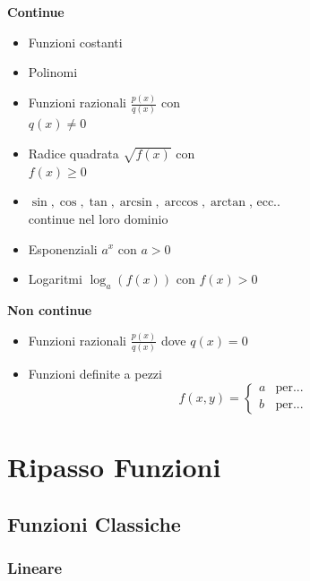 \documentclass{article}  %
\begin{document}
\begin{osservazioni}
	\begin{minipage}[t]{0.5\linewidth}
		\textbf{Continue}
		\begin{itemize}
			\item Funzioni costanti
			\item Polinomi
			\item Funzioni razionali $\frac{p(x)}{q(x)}$ con \\ $q(x) \neq 0$
			\item Radice quadrata $\sqrt{f(x)}$ con \\ $f(x) \geq 0$
			\item $\sin, \cos, \tan, \arcsin, \arccos, \arctan$, ecc.. \\ continue nel loro dominio
			\item Esponenziali $a^x$ con $a > 0$
			\item Logaritmi $\log_a(f(x))$ con $f(x) > 0$
		\end{itemize}
	\end{minipage}%
	\begin{minipage}[t]{0.5\linewidth}
		\textbf{Non continue}
		\begin{itemize}
			\item Funzioni razionali $\frac{p(x)}{q(x)}$ dove $q(x) = 0$
			\item Funzioni definite a pezzi \\
			      \[
				      f(x,y) =
				      \begin{cases}
					      a & \text{per...} \\
					      b & \text{per...}
				      \end{cases}
			      \]
		\end{itemize}
	\end{minipage}
\end{osservazioni}
\break
\section{Ripasso Funzioni}
\subsection{Funzioni Classiche}
\subsubsection{Lineare}
\end{document}

